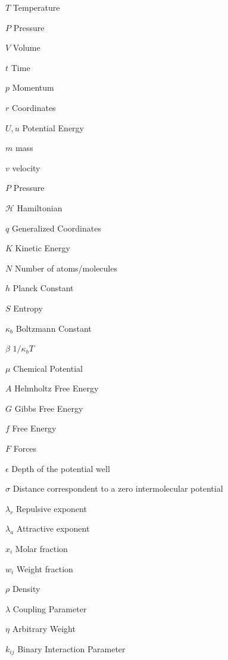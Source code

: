 \documentclass[
	12pt,				%
	openany,			%
	oneside,			%
	a4paper,			%
	english,			%
	brazil				%
	]{abntex2}
\begin{document}
\begin{simbolos}
  \item[$T$] Temperature
  \item[$P$] Pressure
  \item[$V$] Volume
  \item[$t$] Time
  \item[$p$] Momentum
  \item[$r$] Coordinates
  \item[$U,u$] Potential Energy
  \item[$m$] mass
  \item[$v$] velocity
  \item[$P$] Pressure
  \item[$ \mathcal{H} $] Hamiltonian
  \item[$q$] Generalized Coordinates
  \item[$K $] 	Kinetic Energy 
  \item[$N$] Number of atoms/molecules
  \item[$h$] Planck Constant
  \item[$S$] Entropy
  \item[$\kappa_{b}$] Boltzmann Constant
  \item[$\beta$] $1/\kappa_{b}T$
  \item[$\mu$] Chemical Potential
  \item[$A$] Helmholtz Free Energy
  \item[$G$] Gibbs Free Energy
  \item[$f$] Free Energy
  \item[$F$] Forces
  \item[$\epsilon$] Depth of the potential well
  \item[$\sigma$] Distance correspondent to a zero intermolecular potential
  \item[$\lambda _{r}$] Repulsive exponent
  \item[$\lambda _{a}$] Attractive exponent
  \item[$x_{i}$] Molar fraction 
  \item[$w_{i}$] Weight fraction 
  \item[$\rho$] Density
  \item[$\lambda$] Coupling Parameter 
  \item[$\eta$] Arbitrary Weight 
  \item[$k_{ij}$] Binary Interaction Parameter
\end{simbolos}

\tableofcontents*
\cleardoublepage
\end{document}
